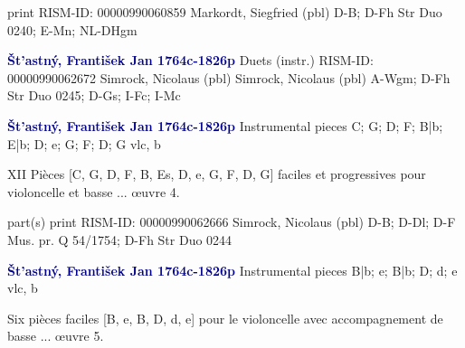 \documentclass[twocolumn]{book}
\begin{document}
\newline print
\newline RISM-ID: 00000990060859
\newline Markordt, Siegfried  (pbl)
\newline D-B; D-Fh  Str Duo 0240; E-Mn; NL-DHgm
\newline \par \vspace{7pt} \textcolor{darkblue}{\textbf{Št'astný, František Jan  1764c-1826p}}
\newline Duets (instr.)    
\newline RISM-ID: 00000990062672
\newline Simrock, Nicolaus  (pbl)
\newline Simrock, Nicolaus  (pbl)
\newline A-Wgm; D-Fh  Str Duo 0245; D-Gs; I-Fc; I-Mc
\newline \par \vspace{7pt} \textcolor{darkblue}{\textbf{Št'astný, František Jan  1764c-1826p}}
\newline Instrumental pieces  C; G; D; F; B|b; E|b; D; e; G; F; D; G  
\newline vlc, b
\newline \begin{itshape}XII Pièces [C, G, D, F, B, Es, D, e, G, F, D, G] faciles et progressives pour violoncelle et basse ... œuvre 4.\end{itshape} 
\newline \textcolor{darkblue}{}  part(s)  
\newline print
\newline RISM-ID: 00000990062666
\newline Simrock, Nicolaus  (pbl)
\newline D-B; D-Dl; D-F  Mus. pr. Q 54/1754; D-Fh  Str Duo 0244
\newline \par \vspace{7pt} \textcolor{darkblue}{\textbf{Št'astný, František Jan  1764c-1826p}}
\newline Instrumental pieces  B|b; e; B|b; D; d; e  
\newline vlc, b
\newline \begin{itshape}Six pièces faciles [B, e, B, D, d, e] pour le violoncelle avec accompagnement de basse ... œuvre 5.\end{itshape} 
\end{document}
